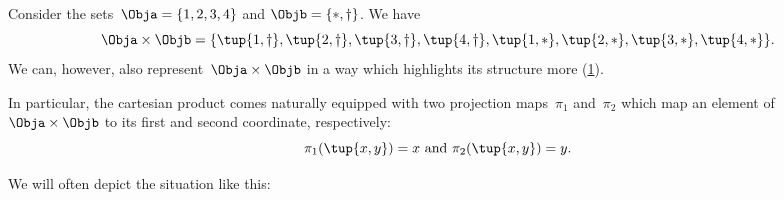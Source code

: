 \begin{example}
    Consider the sets~$\Obja = \{1, 2, 3, 4\}$ and $\Objb = \{ \ast, \dagger \}$.
    We have
    \begin{equation*}
        \Obja \times \Objb = \{ \tup{1, \dagger}, \tup{2, \dagger}, \tup{3, \dagger}, \tup{4, \dagger}, \tup{1, *}, \tup{2, *}, \tup{3, *}, \tup{4, *} \}.
    \end{equation*}
    We can, however, also represent~$\Obja \times \Objb$ in a way which highlights its structure more (\cref{fig:example_cartesian}).

    \begin{figure}[h!]
        \begin{center}
        \end{center}
        \caption{\label{fig:example_cartesian}}
    \end{figure}
    In particular, the cartesian product comes naturally equipped with two projection maps~$\pi_1$ and~$\pi_2$ which map an element of~$\Obja \times \Objb$ to its first and second coordinate, respectively:
    \begin{equation*}
        \pi_1(\tup{x,y}) =  x \text{ and } \pi_2(\tup{x,y}) = y.
    \end{equation*}

    We will often depict the situation like this:
    \begin{center}
    \end{center}
\end{example}



%



